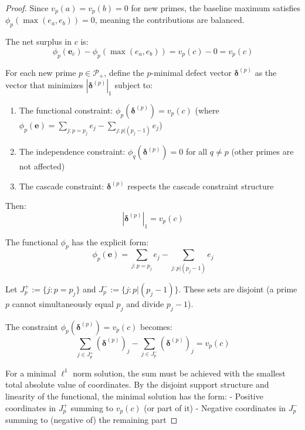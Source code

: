 \begin{proof}
Since $v_p(a) = v_p(b) = 0$ for new primes, the baseline maximum satisfies $\phi_p(\max(e_a, e_b)) = 0$, meaning the contributions are balanced.

The net surplus in $c$ is:
\begin{equation}
\phi_p(\mathbf{e}_c) - \phi_p(\max(e_a, e_b)) = v_p(c) - 0 = v_p(c)
\end{equation}

\begin{lemma}
\label{lem:minimal-defect-ell1-equality}

For each new prime $p \in \mathcal{P}_+$, define the $p$-minimal defect vector $\boldsymbol{\delta}^{(p)}$ as the vector that minimizes $|\boldsymbol{\delta}^{(p)}|_1$ subject to:
\begin{enumerate}
\item The functional constraint: $\phi_p(\boldsymbol{\delta}^{(p)}) = v_p(c)$ (where $\phi_p(\mathbf{e}) = \sum_{j: p = p_j} e_j - \sum_{j: p | (p_j - 1)} e_j$)
\item The independence constraint: $\phi_q(\boldsymbol{\delta}^{(p)}) = 0$ for all $q \neq p$ (other primes are not affected)
\item The cascade constraint: $\boldsymbol{\delta}^{(p)}$ respects the cascade constraint structure
\end{enumerate}

Then:
\begin{equation}
|\boldsymbol{\delta}^{(p)}|_1 = v_p(c)
\end{equation}

\end{lemma}

The functional $\phi_p$ has the explicit form:
\begin{equation}
\phi_p(\mathbf{e}) = \sum_{j: p = p_j} e_j - \sum_{j: p | (p_j - 1)} e_j
\end{equation}

Let $J_p^+ := \{j : p = p_j\}$ and $J_p^- := \{j : p | (p_j - 1)\}$. These sets are disjoint (a prime $p$ cannot simultaneously equal $p_j$ and divide $p_j - 1$).

The constraint $\phi_p(\boldsymbol{\delta}^{(p)}) = v_p(c)$ becomes:
\begin{equation}
\sum_{j \in J_p^+} (\boldsymbol{\delta}^{(p)})_j - \sum_{j \in J_p^-} (\boldsymbol{\delta}^{(p)})_j = v_p(c)
\end{equation}

For a minimal $\ell^1$ norm solution, the sum must be achieved with the smallest total absolute value of coordinates. By the disjoint support structure and linearity of the functional, the minimal solution has the form:
- Positive coordinates in $J_p^+$ summing to $v_p(c)$ (or part of it)
- Negative coordinates in $J_p^-$ summing to (negative of) the remaining part


\end{proof}
